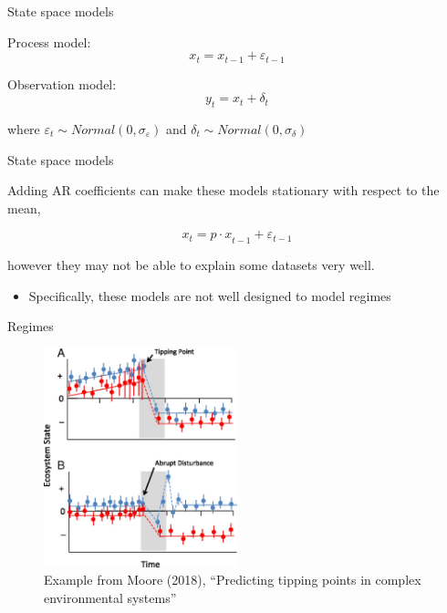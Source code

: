 \documentclass[
  ignorenonframetext,
]{beamer}
\providecommand{\tightlist}{%
  \setlength{\itemsep}{0pt}\setlength{\parskip}{0pt}}
\begin{document}
\begin{frame}{State space models}
\protect\hypertarget{state-space-models-1}{}

Process model: \[{ x }_{ t }={ x }_{ t-1 }+{ \varepsilon  }_{ t-1 }\]

Observation model: \[{ y }_{ t }={ x }_{ t }+{ \delta  }_{ t }\]

where
\({ \varepsilon }_{ t } \sim Normal\left( 0,{ \sigma }_{ \varepsilon } \right)\)
and
\({ \delta }_{ t } \sim Normal\left( 0,{ \sigma }_{ \delta } \right)\)

\end{frame}

\begin{frame}{State space models}
\protect\hypertarget{state-space-models-2}{}

Adding AR coefficients can make these models stationary with respect to
the mean,

\[{ x }_{ t }={ p\cdot x }_{ t-1 }+{ \varepsilon  }_{ t-1 }\]

however they may not be able to explain some datasets very well.

\begin{itemize}
\tightlist
\item
  Specifically, these models are not well designed to model regimes
\end{itemize}

\end{frame}

\begin{frame}{Regimes}
\protect\hypertarget{regimes}{}

\begin{figure}
\hypertarget{id}{%
\centering
\includegraphics[width=0.5\textwidth,height=0.5\textheight]{Moore_2018.jpg}
\caption{Example from Moore (2018), ``Predicting tipping points in
complex environmental systems''}\label{id}
}
\end{figure}

\end{frame}
\end{document}
